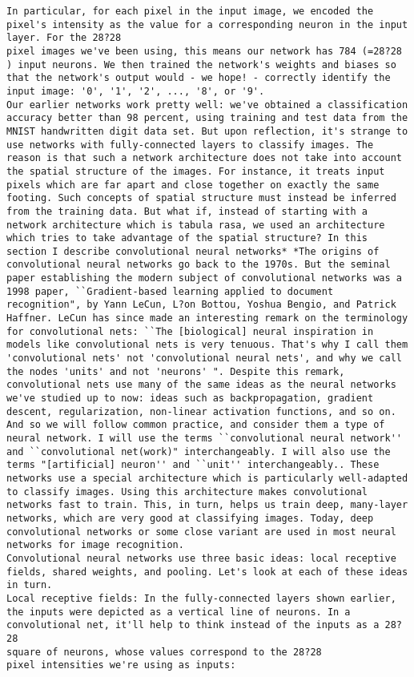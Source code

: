\begin{lstlisting}
In particular, for each pixel in the input image, we encoded the pixel's intensity as the value for a corresponding neuron in the input layer. For the 28?28
pixel images we've been using, this means our network has 784 (=28?28
) input neurons. We then trained the network's weights and biases so that the network's output would - we hope! - correctly identify the input image: '0', '1', '2', ..., '8', or '9'.
Our earlier networks work pretty well: we've obtained a classification accuracy better than 98 percent, using training and test data from the MNIST handwritten digit data set. But upon reflection, it's strange to use networks with fully-connected layers to classify images. The reason is that such a network architecture does not take into account the spatial structure of the images. For instance, it treats input pixels which are far apart and close together on exactly the same footing. Such concepts of spatial structure must instead be inferred from the training data. But what if, instead of starting with a network architecture which is tabula rasa, we used an architecture which tries to take advantage of the spatial structure? In this section I describe convolutional neural networks* *The origins of convolutional neural networks go back to the 1970s. But the seminal paper establishing the modern subject of convolutional networks was a 1998 paper, ``Gradient-based learning applied to document recognition", by Yann LeCun, L?on Bottou, Yoshua Bengio, and Patrick Haffner. LeCun has since made an interesting remark on the terminology for convolutional nets: ``The [biological] neural inspiration in models like convolutional nets is very tenuous. That's why I call them 'convolutional nets' not 'convolutional neural nets', and why we call the nodes 'units' and not 'neurons' ". Despite this remark, convolutional nets use many of the same ideas as the neural networks we've studied up to now: ideas such as backpropagation, gradient descent, regularization, non-linear activation functions, and so on. And so we will follow common practice, and consider them a type of neural network. I will use the terms ``convolutional neural network'' and ``convolutional net(work)" interchangeably. I will also use the terms "[artificial] neuron'' and ``unit'' interchangeably.. These networks use a special architecture which is particularly well-adapted to classify images. Using this architecture makes convolutional networks fast to train. This, in turn, helps us train deep, many-layer networks, which are very good at classifying images. Today, deep convolutional networks or some close variant are used in most neural networks for image recognition.
Convolutional neural networks use three basic ideas: local receptive fields, shared weights, and pooling. Let's look at each of these ideas in turn.
Local receptive fields: In the fully-connected layers shown earlier, the inputs were depicted as a vertical line of neurons. In a convolutional net, it'll help to think instead of the inputs as a 28?28
square of neurons, whose values correspond to the 28?28
pixel intensities we're using as inputs:


\end{lstlisting}
